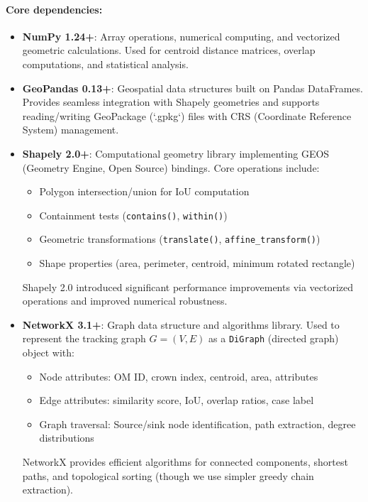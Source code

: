 \paragraph{Core dependencies:}
\begin{itemize}[leftmargin=*, itemsep=2pt]
    \item \textbf{NumPy 1.24+}: Array operations, numerical computing, and vectorized geometric calculations. Used for centroid distance matrices, overlap computations, and statistical analysis.
    
    \item \textbf{GeoPandas 0.13+}: Geospatial data structures built on Pandas DataFrames. Provides seamless integration with Shapely geometries and supports reading/writing GeoPackage (`.gpkg`) files with CRS (Coordinate Reference System) management.
    
    \item \textbf{Shapely 2.0+}: Computational geometry library implementing GEOS (Geometry Engine, Open Source) bindings. Core operations include:
    \begin{itemize}
        \item Polygon intersection/union for IoU computation
        \item Containment tests (\texttt{contains()}, \texttt{within()})
        \item Geometric transformations (\texttt{translate()}, \texttt{affine\_transform()})
        \item Shape properties (area, perimeter, centroid, minimum rotated rectangle)
    \end{itemize}
    Shapely 2.0 introduced significant performance improvements via vectorized operations and improved numerical robustness.
    
    \item \textbf{NetworkX 3.1+}: Graph data structure and algorithms library. Used to represent the tracking graph $G = (V, E)$ as a \texttt{DiGraph} (directed graph) object with:
    \begin{itemize}
        \item Node attributes: OM ID, crown index, centroid, area, attributes
        \item Edge attributes: similarity score, IoU, overlap ratios, case label
        \item Graph traversal: Source/sink node identification, path extraction, degree distributions
    \end{itemize}
    NetworkX provides efficient algorithms for connected components, shortest paths, and topological sorting (though we use simpler greedy chain extraction).
    

\end{itemize}
